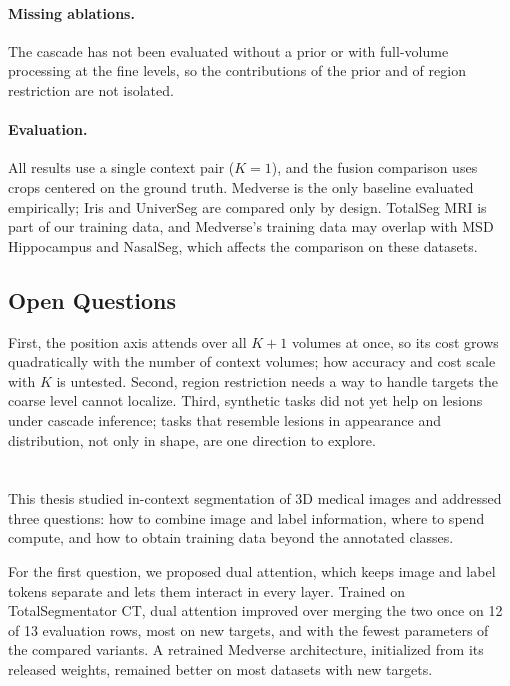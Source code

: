 \documentclass[hidelinks, a4paper, 12pt, ngerman, english]{article}  %
\begin{document}
\paragraph{Missing ablations.}
The cascade has not been evaluated without a prior or with full-volume
processing at the fine levels, so the contributions of the prior and of region
restriction are not isolated.

\paragraph{Evaluation.}
All results use a single context pair ($K = 1$), and the fusion comparison
uses crops centered on the ground truth. Medverse is the only baseline
evaluated empirically; Iris and UniverSeg are compared only by design.
TotalSeg MRI is part of our training data, and Medverse's training data may
overlap with MSD Hippocampus and NasalSeg, which affects the comparison on
these datasets.

\subsection{Open Questions}\label{sec:discussion-open}

First, the position axis attends over all $K+1$ volumes at once, so its cost
grows quadratically with the number of context volumes; how accuracy and cost
scale with $K$ is untested. Second, region restriction needs a way to handle
targets the coarse level cannot localize. Third, synthetic tasks did not yet
help on lesions under cascade inference; tasks that resemble lesions in
appearance and distribution, not only in shape, are one direction to explore.%
\section{}\label{sec:conclusion}

This thesis studied in-context segmentation of 3D medical images and addressed
three questions: how to combine image and label information, where to spend
compute, and how to obtain training data beyond the annotated classes.

For the first question, we proposed dual attention, which keeps image and label
tokens separate and lets them interact in every layer. Trained on
TotalSegmentator CT, dual attention improved over merging the two once on 12
of 13 evaluation rows, most on new targets, and with the fewest parameters of
the compared variants. A retrained Medverse architecture, initialized from its
released weights, remained better on most datasets with new targets.
\end{document}
